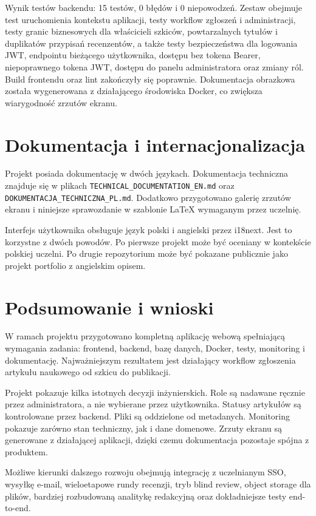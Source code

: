 \documentclass[times]{san}
\begin{document}
Wynik testów backendu: 15 testów, 0 błędów i 0 niepowodzeń. Zestaw obejmuje test uruchomienia kontekstu aplikacji, testy workflow zgłoszeń i administracji, testy granic biznesowych dla właścicieli szkiców, powtarzalnych tytułów i duplikatów przypisań recenzentów, a także testy bezpieczeństwa dla logowania JWT, endpointu bieżącego użytkownika, dostępu bez tokena Bearer, niepoprawnego tokena JWT, dostępu do panelu administratora oraz zmiany ról. Build frontendu oraz lint zakończyły się poprawnie. Dokumentacja obrazkowa została wygenerowana z działającego środowiska Docker, co zwiększa wiarygodność zrzutów ekranu.

\section{Dokumentacja i internacjonalizacja}

Projekt posiada dokumentację w dwóch językach. Dokumentacja techniczna znajduje się w plikach \texttt{TECHNICAL\_DOCUMENTATION\_EN.md} oraz \texttt{DOKUMENTACJA\_TECHNICZNA\_PL.md}. Dodatkowo przygotowano galerię zrzutów ekranu i niniejsze sprawozdanie w szablonie LaTeX wymaganym przez uczelnię.

Interfejs użytkownika obsługuje język polski i angielski przez i18next. Jest to korzystne z dwóch powodów. Po pierwsze projekt może być oceniany w kontekście polskiej uczelni. Po drugie repozytorium może być pokazane publicznie jako projekt portfolio z angielskim opisem.

\section{Podsumowanie i wnioski}

W ramach projektu przygotowano kompletną aplikację webową spełniającą wymagania zadania: frontend, backend, bazę danych, Docker, testy, monitoring i dokumentację. Najważniejszym rezultatem jest działający workflow zgłoszenia artykułu naukowego od szkicu do publikacji.

Projekt pokazuje kilka istotnych decyzji inżynierskich. Role są nadawane ręcznie przez administratora, a nie wybierane przez użytkownika. Statusy artykułów są kontrolowane przez backend. Pliki są oddzielone od metadanych. Monitoring pokazuje zarówno stan techniczny, jak i dane domenowe. Zrzuty ekranu są generowane z działającej aplikacji, dzięki czemu dokumentacja pozostaje spójna z produktem.

Możliwe kierunki dalszego rozwoju obejmują integrację z uczelnianym SSO, wysyłkę e-mail, wieloetapowe rundy recenzji, tryb blind review, object storage dla plików, bardziej rozbudowaną analitykę redakcyjną oraz dokładniejsze testy end-to-end.

\spistabel
\spisrysunkow
\printbibliography
\end{document}
